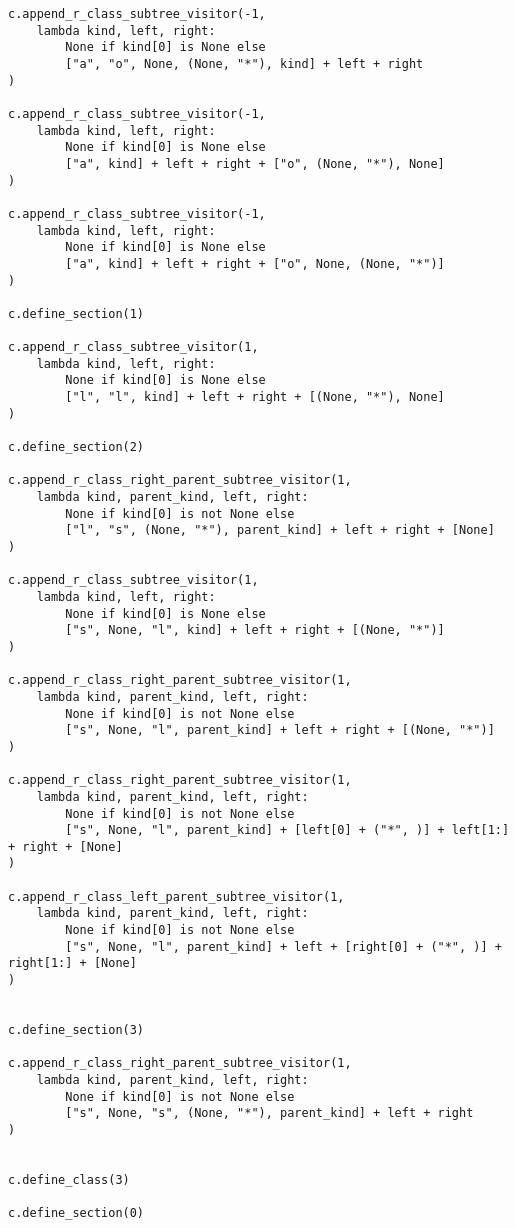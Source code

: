 \documentclass[final]{article}
\theoremstyle{definition}
\theoremstyle{remark}
\begin{document}
\begin{lstlisting}
c.append_r_class_subtree_visitor(-1,
    lambda kind, left, right:
        None if kind[0] is None else
        ["a", "o", None, (None, "*"), kind] + left + right
)

c.append_r_class_subtree_visitor(-1,
    lambda kind, left, right:
        None if kind[0] is None else
        ["a", kind] + left + right + ["o", (None, "*"), None]
)

c.append_r_class_subtree_visitor(-1,
    lambda kind, left, right:
        None if kind[0] is None else
        ["a", kind] + left + right + ["o", None, (None, "*")]
)

c.define_section(1)

c.append_r_class_subtree_visitor(1,
    lambda kind, left, right:
        None if kind[0] is None else
        ["l", "l", kind] + left + right + [(None, "*"), None]
)

c.define_section(2)

c.append_r_class_right_parent_subtree_visitor(1,
    lambda kind, parent_kind, left, right:
        None if kind[0] is not None else
        ["l", "s", (None, "*"), parent_kind] + left + right + [None]
)

c.append_r_class_subtree_visitor(1,
    lambda kind, left, right:
        None if kind[0] is None else
        ["s", None, "l", kind] + left + right + [(None, "*")]
)

c.append_r_class_right_parent_subtree_visitor(1,
    lambda kind, parent_kind, left, right:
        None if kind[0] is not None else
        ["s", None, "l", parent_kind] + left + right + [(None, "*")]
)

c.append_r_class_right_parent_subtree_visitor(1,
    lambda kind, parent_kind, left, right:
        None if kind[0] is not None else
        ["s", None, "l", parent_kind] + [left[0] + ("*", )] + left[1:] + right + [None]
)

c.append_r_class_left_parent_subtree_visitor(1,
    lambda kind, parent_kind, left, right:
        None if kind[0] is not None else
        ["s", None, "l", parent_kind] + left + [right[0] + ("*", )] + right[1:] + [None]
)


c.define_section(3)

c.append_r_class_right_parent_subtree_visitor(1,
    lambda kind, parent_kind, left, right:
        None if kind[0] is not None else
        ["s", None, "s", (None, "*"), parent_kind] + left + right
)


c.define_class(3)

c.define_section(0)


\end{lstlisting}
\end{document}
